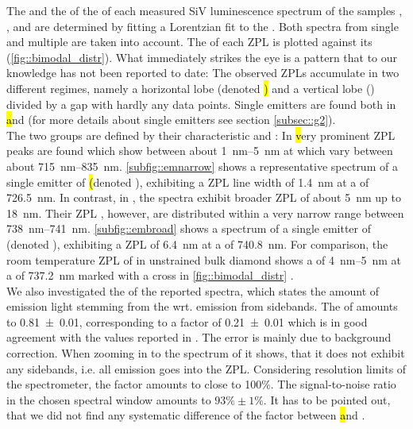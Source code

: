 	The \cwl and the \lw of the \zpl of each measured SiV luminescence spectrum of the samples \insituF, \insituS, and \insituH are determined by fitting a Lorentzian fit to the \ZPL.
	Both spectra from single and multiple \sivs are taken into account.
	The \lw of each ZPL is plotted against its \cwl (\autoref{fig::bimodal_distr}).
	What immediately strikes the eye is a pattern that to our knowledge has not been reported to date: 
	The observed ZPLs accumulate in two different regimes, namely a horizontal lobe (denoted \hl) and a vertical lobe (\vl) divided by a gap with hardly any data points. 
	Single emitters are found both in \hl and \vl (for more details about single emitters see section \ref{subsec::g2}).
	\\
	The two groups are defined by their characteristic \cwls and \lws: 
	In \hl very prominent ZPL peaks are found which show \lws between about \SIrange{1}{5}{nm} at \cwls which vary between about \SIrange{715}{835}{nm}.
	\autoref{subfig::emnarrow} shows a representative spectrum of a single emitter of \hl (denoted \emnarrow), exhibiting a ZPL line width of \SI{1.4}{nm} at a \cwl of \SI{726.5}{nm}.
	In contrast, in \vl, the spectra exhibit broader ZPL \lws of about \SI{5}{nm} up to \SI{18}{nm}.
	Their ZPL \cwls, however, are distributed within a very narrow range between \SIrange{738}{741}{nm}.
	\autoref{subfig::embroad} shows a spectrum of a single emitter of \vl (denoted \embroad), exhibiting a ZPL \lw of \SI{6.4}{nm} at a \cwl of \SI{740.8}{nm}.
	For comparison, the room temperature ZPL of \sivs in unstrained bulk diamond shows a \lw of \SIrange{4}{5}{nm} at a \cwl of \SI{737.2}{nm} marked with a cross in \autoref{fig::bimodal_distr} \cite{Arend2016a,Dietrich2014}. 
	\\
	We also investigated the \db of the reported spectra, which states the amount of emission light stemming from the \ZPL wrt. emission from sidebands.
	The \db of \emnarrow  amounts to \num[separate-uncertainty]{0.81(1)}, corresponding to a \hr factor of \num[separate-uncertainty]{0.21(1)} which is in good agreement with the values reported in \cite{Neu2011b}.
	The error is mainly due to background correction. 
	When zooming in to the spectrum of \embroad it shows, that it does not exhibit any sidebands, i.e. all emission goes into the ZPL. 
	Considering resolution limits of the spectrometer, the \db factor amounts to close to 100\%.
	The signal-to-noise ratio in the chosen spectral window amounts to $93\%\pm1\%$.
	It has to be pointed out, that we did not find any systematic difference of the \db factor between \hl and \vl.
